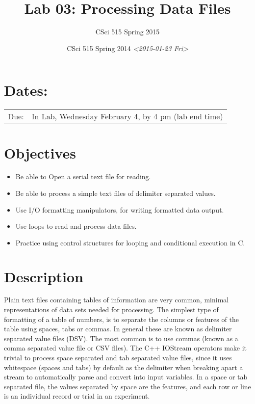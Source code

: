 \documentclass[11pt]{article}
\author{CSci 515 Spring 2015}
\date{CSci 515 Spring 2014 \textit{<2015-01-23 Fri>}}
\title{Lab 03: Processing Data Files}
\begin{document}
\maketitle

\section*{Dates:}
\label{sec-1}
\begin{center}
\begin{tabular}{ll}
Due: & In Lab, Wednesday February 4, by 4 pm (lab end time)\\
\end{tabular}
\end{center}
\section*{Objectives}
\label{sec-2}
\begin{itemize}
\item Be able to Open a serial text file for reading.
\item Be able to process a simple text files of delimiter separated values.
\item Use I/O formatting manipulators, for writing formatted data output.
\item Use loops to read and process data files.
\item Practice using control structures for looping and conditional
execution in C.
\end{itemize}
\section*{Description}
\label{sec-3}
Plain text files containing tables of information are very common,
minimal representations of data sets needed for processing.  The
simplest type of formatting of a table of numbers, is to separate the
columns or features of the table using spaces, tabs or commas. In
general these are known as delimiter separated value files (DSV).  The
most common is to use commas (known as a comma separated value file or
CSV files).  The C++ IOStream operators make it trivial to process
space separated and tab separated value files, since it uses
whitespace (spaces and tabs) by default as the delimiter when breaking
apart a stream to automatically parse and convert into input
variables. In a space or tab separated file, the values separated by
space are the features, and each row or line is an individual record
or trial in an experiment.
\end{document}
